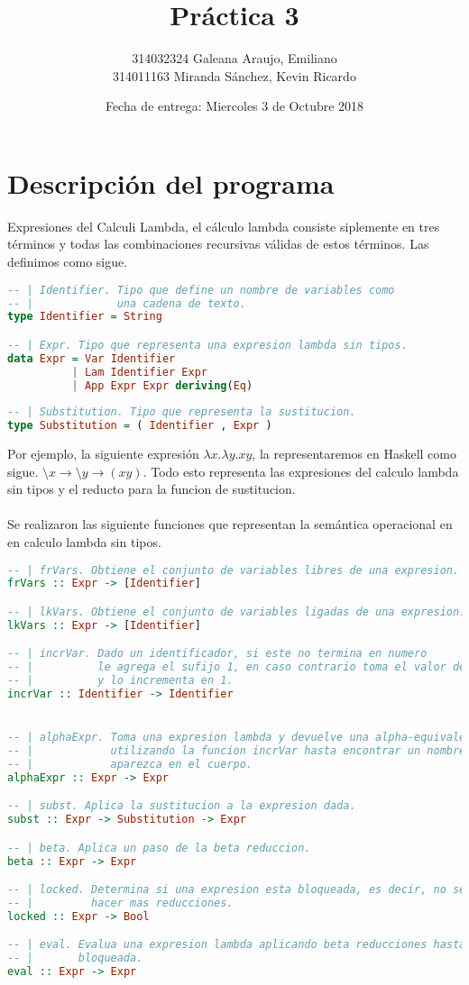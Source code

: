 \documentclass{article}
\title{Práctica 3}
\author{314032324	Galeana Araujo, Emiliano\\
	314011163	Miranda Sánchez, Kevin Ricardo}
\affil{Facultad de Ciencias, UNAM}
\date{Fecha de entrega: Miercoles 3 de Octubre 2018}
\begin{document}
\maketitle

\section{Descripción del programa}
Expresiones del Calculi Lambda, el cálculo lambda consiste siplemente en tres
términos y todas las combinaciones recursivas válidas de estos términos. Las
definimos como sigue.
\begin{lstlisting}[language=Haskell]
-- | Identifier. Tipo que define un nombre de variables como 
-- |             una cadena de texto.
type Identifier = String

-- | Expr. Tipo que representa una expresion lambda sin tipos.
data Expr = Var Identifier
          | Lam Identifier Expr
          | App Expr Expr deriving(Eq)
           
-- | Substitution. Tipo que representa la sustitucion.
type Substitution = ( Identifier , Expr )
\end{lstlisting}
Por ejemplo, la siguiente expresión $\lambda x. \lambda y. xy$, la
representaremos en Haskell como sigue. $\setminus x \rightarrow \setminus y
\rightarrow (x y)$. Todo esto representa las expresiones del calculo lambda sin
tipos y el reducto para la funcion de sustitucion.\\
\\Se realizaron las siguiente funciones que representan la semántica operacional
en en calculo lambda sin tipos.

\begin{lstlisting}[language=Haskell]
-- | frVars. Obtiene el conjunto de variables libres de una expresion.
frVars :: Expr -> [Identifier]

-- | lkVars. Obtiene el conjunto de variables ligadas de una expresion.
lkVars :: Expr -> [Identifier]

-- | incrVar. Dado un identificador, si este no termina en numero
-- |          le agrega el sufijo 1, en caso contrario toma el valor del numero
-- |          y lo incrementa en 1.
incrVar :: Identifier -> Identifier


-- | alphaExpr. Toma una expresion lambda y devuelve una alpha-equivalente 
-- |            utilizando la funcion incrVar hasta encontrar un nombre que no
-- |            aparezca en el cuerpo.
alphaExpr :: Expr -> Expr

-- | subst. Aplica la sustitucion a la expresion dada.
subst :: Expr -> Substitution -> Expr

-- | beta. Aplica un paso de la beta reduccion.
beta :: Expr -> Expr

-- | locked. Determina si una expresion esta bloqueada, es decir, no se pueden
-- |         hacer mas reducciones.
locked :: Expr -> Bool

-- | eval. Evalua una expresion lambda aplicando beta reducciones hasta quedar
-- |       bloqueada.
eval :: Expr -> Expr

\end{lstlisting}
\end{document}
